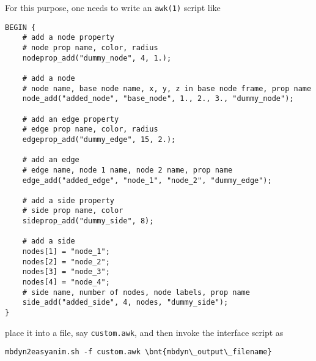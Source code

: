 For this purpose, one needs to write an \texttt{awk(1)} script like
\begin{verbatim}
BEGIN {
    # add a node property
    # node prop name, color, radius
    nodeprop_add("dummy_node", 4, 1.);

    # add a node
    # node name, base node name, x, y, z in base node frame, prop name
    node_add("added_node", "base_node", 1., 2., 3., "dummy_node");

    # add an edge property
    # edge prop name, color, radius
    edgeprop_add("dummy_edge", 15, 2.);

    # add an edge
    # edge name, node 1 name, node 2 name, prop name
    edge_add("added_edge", "node_1", "node_2", "dummy_edge");

    # add a side property
    # side prop name, color
    sideprop_add("dummy_side", 8);

    # add a side
    nodes[1] = "node_1";
    nodes[2] = "node_2";
    nodes[3] = "node_3";
    nodes[4] = "node_4";
    # side name, number of nodes, node labels, prop name
    side_add("added_side", 4, nodes, "dummy_side");
}
\end{verbatim}
place it into a file, say \texttt{custom.awk},
and then invoke the interface script as
\begin{Verbatim}[commandchars=\\\{\}]
    mbdyn2easyanim.sh -f custom.awk \bnt{mbdyn\_output\_filename}
\end{Verbatim}



\begin{comment} %
\section{Altair MotionView}
Support for Altair's MotionView must be enabled at configure time, 
by using the directive \kw{--enable-motionview};
the specific client libraries are required.
It should generate a binary model and results file compatible
with MotionView.
It is activated by the directive
\begin{verbatim}
    output results : motion view ;
\end{verbatim}
No special parameters are available at the moment; 
this interface is under development.
\end{comment} %

